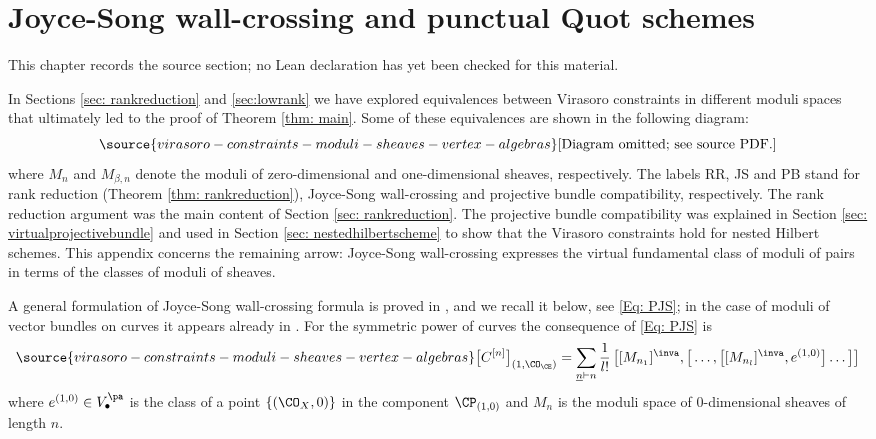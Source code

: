 \chapter{Joyce-Song wall-crossing and punctual Quot schemes}
\label{virasoro-constraints-moduli-sheaves-vertex-algebras-chapter-07}

\begin{remark}
\label{virasoro-constraints-moduli-sheaves-vertex-algebras-chapter-07-source}
This chapter records the source section; no Lean declaration has yet been checked for this material.
\notready
\end{remark}

\label{app:A}
In Sections \ref{sec: rankreduction} and \ref{sec:lowrank} we have explored equivalences between Virasoro constraints in different moduli spaces that ultimately led to the proof of Theorem \ref{thm: main}. Some of these equivalences are shown in the following diagram:
\begin{equation}
\label{Eq:pairsheafWC}
\source{virasoro-constraints-moduli-sheaves-vertex-algebras}
    \text{[Diagram omitted; see source PDF.]}
\end{equation}
where $M_n$ and $M_{\beta,n}$ denote the moduli of zero-dimensional and one-dimensional sheaves, respectively. The labels RR, JS and PB stand for rank reduction (Theorem \ref{thm: rankreduction}), Joyce-Song wall-crossing and projective bundle compatibility, respectively. The rank reduction argument was the main content of Section \ref{sec: rankreduction}. The projective bundle compatibility was explained in Section \ref{sec: virtualprojectivebundle} and used in Section \ref{sec: nestedhilbertscheme} to show that the Virasoro constraints hold for nested Hilbert schemes. This appendix concerns the remaining arrow: Joyce-Song wall-crossing expresses the virtual fundamental class of moduli of pairs in terms of the classes of moduli of sheaves.

 A general formulation of Joyce-Song wall-crossing formula is proved in \cite[Theorem A.4]{Bo21.5}, and we recall it below, see \eqref{Eq: PJS}; in the case of moduli of vector bundles on curves it appears already in \cite[Theorem 2.8]{Bu22}. For the symmetric power of curves the consequence of \eqref{Eq: PJS}  is
\begin{equation}\label{eq: JSsymmetricpowers}
\source{virasoro-constraints-moduli-sheaves-vertex-algebras}
\big[C^{[n]}\big]_{(1,\CO_\CE)}=\sum_{\substack{ \underline{n}\vdash n}}\frac{1}{l!}\, \big[[M_{n_1}]^\inva, \big[\ldots, \big[[M_{n_l}]^\inva, e^{(1,0)}\big]\ldots\big]\big]\end{equation}
where $e^{(1,0)}\in V_\bullet^{\pa}$ is the class of a point $\{(\CO_X, 0)\}$ in the component $\CP_{(1,0)}$ and $M_n$ is the moduli space of 0-dimensional sheaves of length $n$.

